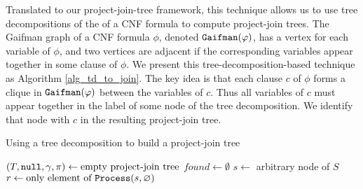 Translated to our project-join-tree framework, this technique allows us to use tree decompositions of the  of a CNF formula to compute project-join trees.
The Gaifman graph of a CNF formula $\phi$, denoted $\texttt{\upshape Gaifman}(\varphi)$, has a vertex for each variable of $\phi$, and two vertices are adjacent if the corresponding variables appear together in some clause of $\phi$.
We present this tree-decomposition-based technique as Algorithm \ref{alg_td_to_join}.
The key idea is that each clause $c$ of $\phi$ forms a clique in $\texttt{\upshape Gaifman}(\varphi)$ between the variables of $c$.
Thus all variables of $c$ must appear together in the label of some node of the tree decomposition.
We identify that node with $c$ in the resulting project-join tree.
\begin{algorithm*}
\caption{Using a tree decomposition to build a project-join tree}
\label{alg_td_to_join}
    \DontPrintSemicolon
    $(T, \texttt{\upshape null}, \gamma, \pi) \gets \text{empty project-join tree}$\;
    $found \gets \emptyset$
    $s \gets$ arbitrary node of $S$ \label{line_arbitrary_node}
    $r \gets \text{only element of}~\texttt{\upshape Process}(s, \varnothing)$\;
\end{algorithm*}

